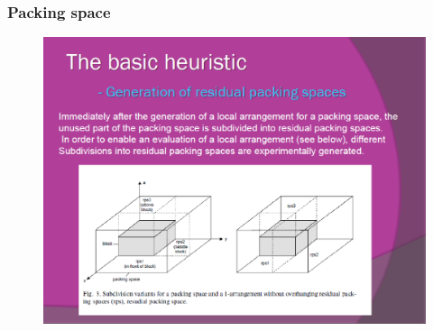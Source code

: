 \documentclass{beamer}
\begin{document}
\begin{frame}
\frametitle{Packing space }
\begin{figure}[!th]
\begin{center}
\includegraphics[width=1\textwidth]{img/picn7.eps}
\end{center}
\end{figure}
\end{frame}
\end{document}
